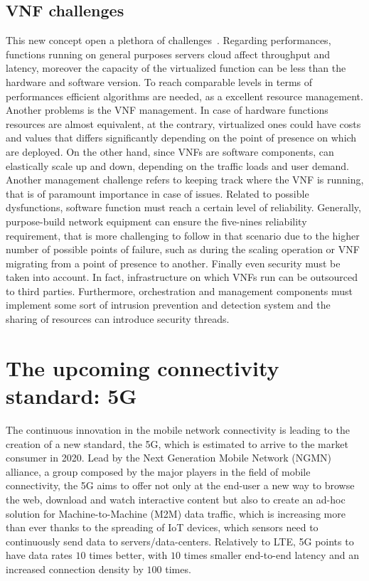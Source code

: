 \subsection{VNF challenges}
This new concept open a plethora of challenges~\cite{han2015network}. Regarding
performances, functions running on general purposes servers cloud affect
throughput and latency, moreover the capacity of the virtualized function can
be less than the hardware and software version. To reach comparable levels in
terms of performances efficient algorithms are needed, as a excellent resource
management. Another problems is the VNF management. In case of hardware
functions resources are almost equivalent, at the contrary, virtualized ones
could have costs and values that differs significantly depending on the point
of presence on which are deployed. On the other hand, since VNFs are software
components, can elastically scale up and down, depending on the traffic loads
and user demand. Another management challenge refers to keeping track where the
VNF is running, that is of paramount importance in case of issues. Related to
possible dysfunctions, software function must reach a certain level of
reliability. Generally, purpose-build network equipment can ensure the
five-nines reliability requirement, that is more challenging to follow in that
scenario due to the higher number of possible points of failure, such as during
the scaling operation or VNF migrating from a point of presence to another.
Finally even security must be taken into account. In fact, infrastructure on
which VNFs run can be outsourced to third parties. Furthermore, orchestration
and management components must implement some sort of intrusion prevention and
detection system and the sharing of resources can introduce security threads.

\section{The upcoming connectivity standard: 5G}
The continuous innovation in the mobile network connectivity is leading to the
creation of a new standard, the 5G, which is estimated to arrive to the market
consumer in 2020. Lead by the Next Generation Mobile Network (NGMN)
alliance, a group composed by the major players in the field of mobile
connectivity, the 5G aims to offer not only at the end-user a new way to browse 
the web, download and watch interactive content but also to create an ad-hoc 
solution for Machine-to-Machine (M2M) data traffic, which is increasing more 
than ever thanks to the spreading of IoT devices, which sensors need to 
continuously send data to servers/data-centers. Relatively to LTE, 5G points to have data rates $10$ times better, with $10$ times 
smaller end-to-end latency and an increased connection density by $100$ 
times.

